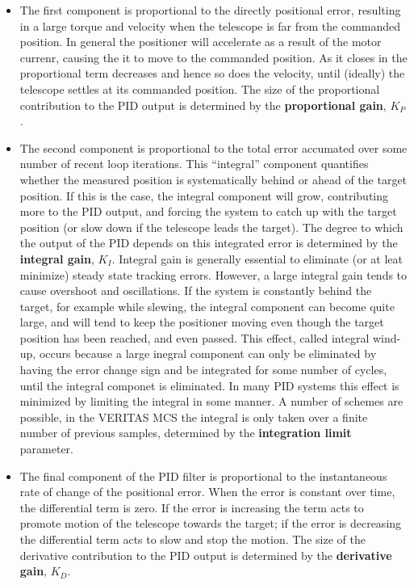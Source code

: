 \documentclass[letterpaper,12pt]{report}
\begin{document}
\begin{itemize}
\item The first component is proportional to the directly positional
error, resulting in a large torque and velocity when the telescope is
far from the commanded position. In general the positioner will
accelerate as a result of the motor currenr, causing the it to move to
the commanded position. As it closes in the proportional term
decreases and hence so does the velocity, until (ideally) the
telescope settles at its commanded position. The size of the
proportional contribution to the PID output is determined by the
\textbf{proportional gain}, $K_P$.

\item The second component is proportional to the total error accumated
over some number of recent loop iterations. This ``integral''
component quantifies whether the measured position is systematically
behind or ahead of the target position. If this is the case, the
integral component will grow, contributing more to the PID output, and
forcing the system to catch up with the target position (or slow down
if the telescope leads the target). The degree to which the output of
the PID depends on this integrated error is determined by the 
\textbf{integral gain}, $K_I$. Integral gain is generally essential
to eliminate (or at leat minimize) steady state tracking
errors. However, a large integral gain tends to cause overshoot and
oscillations. If the system is constantly behind the target, for
example while slewing, the integral component can become quite large,
and will tend to keep the positioner moving even though the target
position has been reached, and even passed. This effect, called
integral wind-up, occurs because a large inegral component can only be
eliminated by having the error change sign and be integrated for some
number of cycles, until the integral componet is eliminated. In many
PID systems this effect is minimized by limiting the integral in some
manner. A number of schemes are possible, in the VERITAS MCS the
integral is only taken over a finite number of previous samples,
determined by the \textbf{integration limit} parameter.

\item The final component of the PID filter is proportional to the
instantaneous rate of change of the positional error. When the error
is constant over time, the differential term is zero. If the error is
increasing the term acts to promote motion of the telescope towards
the target; if the error is decreasing the differential term acts to
slow and stop the motion. The size of the derivative contribution to
the PID output is determined by the \textbf{derivative gain}, $K_D$.
\end{itemize}
\end{document}
